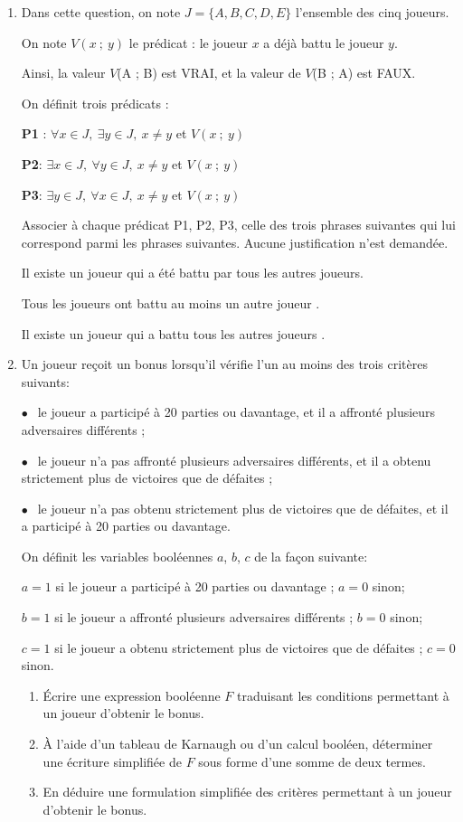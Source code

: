 \documentclass[a4paper,12pt,french]{article}
\begin{document}
\begin{enumerate}[\bfseries 1.]
	\item Dans cette question, on note $J = \{A, B, C, D, E\}$ l'ensemble des cinq joueurs.

	On note $V(x~;~y)$ le prédicat : \og le joueur $x$ a déjà battu le joueur $y$\fg.

	Ainsi, la valeur $V$(A ; B) est VRAI, et la valeur de $V$(B ; A) est FAUX.

	\smallskip

	On définit trois prédicats :


	\qquad \textbf{P1} : $\forall x \in J,\: \exists y \in J,\: x \neq y$  et $V(x~;~y)$

	\qquad \textbf{P2}: $\exists x \in J,\: \forall y \in J,\: x \neq y$  et $V(x~;~y)$

	\qquad \textbf{P3}: $\exists y \in J,\: \forall x \in J,\: x \neq y$  et $V(x~;~y)$

	\smallskip

	Associer à chaque prédicat P1, P2, P3, celle des trois phrases suivantes qui lui correspond parmi
	les phrases suivantes. Aucune justification n'est demandée.

	\og Il existe un joueur qui a été battu par tous les autres joueurs\fg.

	\og Tous les joueurs ont battu au moins un autre joueur \fg.

	\og Il existe un joueur qui a battu tous les autres joueurs \fg.

	\item Un joueur reçoit un bonus lorsqu'il vérifie l'un au moins des trois critères suivants:

	$\bullet~~$ le joueur a participé à 20 parties ou davantage, et il a affronté plusieurs adversaires
	différents ;

	$\bullet~~$  le joueur n'a pas affronté plusieurs adversaires différents, et il a obtenu strictement plus de
	victoires que de défaites ;

	$\bullet~~$  le joueur n'a pas obtenu strictement plus de victoires que de défaites, et il a participé à 20
	parties ou davantage.

	On définit les variables booléennes $a$, $b$, $c$ de la façon suivante:

	$a = 1$ si le joueur a participé à 20 parties ou davantage ; $a = 0$ sinon;

	$b = 1$ si le joueur a affronté plusieurs adversaires différents ; $b = 0$ sinon;

	$c = 1$ si le joueur a obtenu strictement plus de victoires que de défaites ; $c = 0$ sinon.
	\begin{enumerate}[\bfseries a.]
		\item Écrire une expression booléenne $F$ traduisant les conditions permettant à un joueur d'obtenir le bonus.
		\item À l'aide d'un tableau de Karnaugh ou d'un calcul booléen, déterminer une écriture simplifiée de $F$ sous forme d'une somme de deux termes.
		\item En déduire une formulation simplifiée des critères permettant à un joueur d'obtenir le bonus.
	\end{enumerate}
\end{enumerate}
\end{document}
